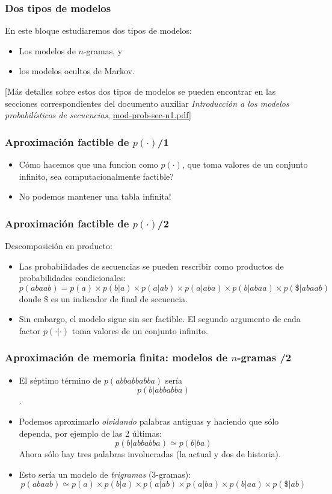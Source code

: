 \begin{frame}
\frametitle{Dos tipos de modelos}

En este bloque estudiaremos dos tipos de modelos:
  \begin{itemize}
  \item  Los modelos de \(n\)-gramas, y
  \item los modelos ocultos de Markov.
  \end{itemize}
[Más detalles sobre estos dos tipos de modelos se pueden encontrar en
las secciones correspondientes del documento auxiliar \emph{Introducción a los modelos probabilísticos de
  secuencias}, \url{mod-prob-sec-n1.pdf}]

\end{frame}

\begin{frame}
  \frametitle{Aproximación factible de \(p(\cdot)\)/1}
  \begin{itemize}
  \item Cómo hacemos que una funcion como \(p(\cdot)\), que toma valores de un conjunto infinito, sea computacionalmente factible?
  \item No podemos mantener una tabla infinita!
  \end{itemize}


\end{frame}

\begin{frame}
  \frametitle{Aproximación factible de \(p(\cdot)\)/2}
  Descomposición en producto:
  

  \begin{itemize}
  \item Las probabilidades de secuencias se pueden rescribir como productos de probabilidades condicionales:
\[p(abaab)=p(a)\times p(b|a) \times p(a|ab) \times p(a|aba) \times p(b|abaa) \times p(\$|abaab)\]
donde \(\$\) es un indicador de final de secuencia.
  \item Sin embargo, el modelo sigue sin ser factible. El segundo argumento de cada factor \(p(\cdot|\cdot)\) toma valores de un conjunto infinito.
  \end{itemize}
\end{frame}

\begin{frame}
  \frametitle{Aproximación de memoria finita: modelos de \(n\)-gramas /2}
  \begin{itemize}
  \item El séptimo término de \(p(abbabbabba)\) sería
\[p(b|abbabba)\]. 
  \item Podemos aproximarlo \emph{olvidando} palabras antiguas y haciendo que sólo dependa, por ejemplo de las 2 últimas:
  \[p(b|abbabba)\simeq p(b|ba)\]
  Ahora sólo hay tres palabras involucradas (la actual y dos de historia).
  \item Esto sería un modelo de \emph{trigramas} (3-gramas):
\[p(abaab) \simeq p(a)\times p(b|a) \times p(a|ab) \times p(a|ba) \times p(b|aa) \times p(\$|ab)\]

  \end{itemize}

\end{frame}

